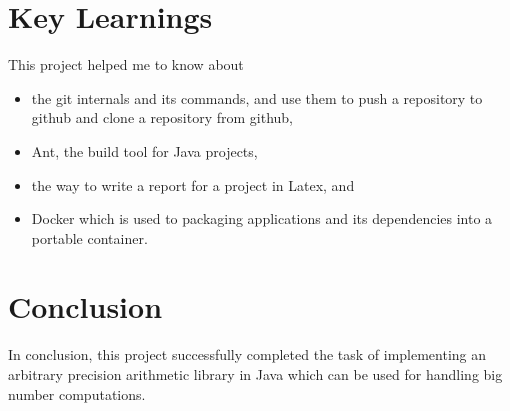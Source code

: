 \documentclass[a4paper,12pt]{article}
\begin{document}
\section{Key Learnings}
This project helped me to know about
\begin{itemize}
    \item  the git internals and its commands, and use them to push a repository to github and clone a repository from github,
    \item Ant, the build tool for Java projects,
    \item the way to write a report for a project in Latex, and
    \item Docker which is used to packaging applications and its dependencies into a portable container.
\end{itemize}

\section{Conclusion}

In conclusion, this project successfully completed the task of implementing an arbitrary precision arithmetic library in Java which can be used for handling big number computations.
\end{document}
